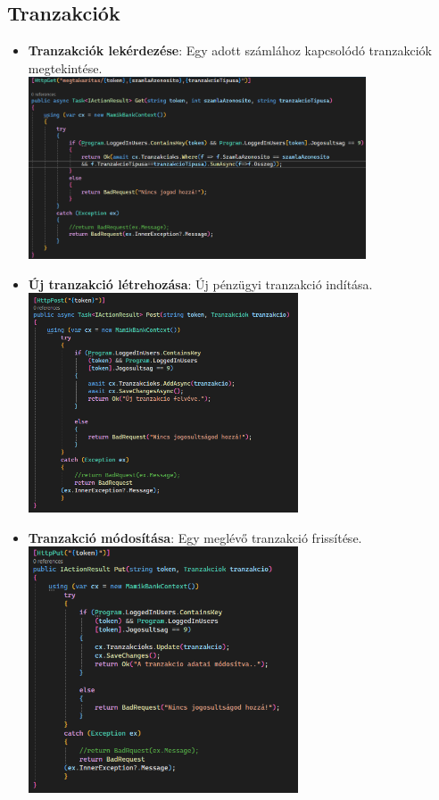 \documentclass[colorlinks]{thesis-kando}
\theoremstyle{definition}
\theoremstyle{remark}
\begin{document}
\begin{itemize}
\subsection{Tranzakciók}
\begin{itemize}
    \item \textbf{Tranzakciók lekérdezése}: Egy adott számlához kapcsolódó tranzakciók megtekintése.
    \\
    \includegraphics[width=10cm]{figures/tranzlekerdezes.png}
    \item \textbf{Új tranzakció létrehozása}: Új pénzügyi tranzakció indítása.
    \\
    \includegraphics[width=8cm]{figures/tranzletrehozas.png}
    \item \textbf{Tranzakció módosítása}: Egy meglévő tranzakció frissítése.
    \\
    \includegraphics[width=8cm]{figures/tranzmodositas.png}

\end{itemize}
\end{itemize}
\end{document}
